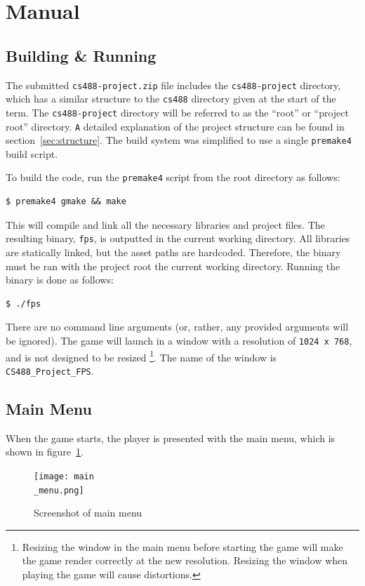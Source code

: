 \documentclass {article}
\begin{document}
\section{Manual}\label{sec:manual}
\subsection{Building \& Running}
The submitted \texttt{cs488-project.zip} file includes the \texttt{cs488-project} directory, which has a similar structure to the \texttt{cs488} directory given at the start of the term. The \texttt{cs488-project} directory will be referred to as the ``root'' or ``project root'' directory. \texttt A detailed explanation of the project structure can be found in section~\ref{sec:structure}. The build system was simplified to use a single \texttt{premake4} build script.

To build the code, run the \texttt{premake4} script from the root directory as follows:
\begin{verbatim}
$ premake4 gmake && make
\end{verbatim}

This will compile and link all the necessary libraries and project files. The resulting binary, \texttt{fps}, is outputted in the current working directory. All libraries are statically linked, but the asset paths are hardcoded. Therefore, the binary must be ran with the project root the current working directory. Running the binary is done as follows:
\begin{verbatim}
$ ./fps
\end{verbatim}

There are no command line arguments (or, rather, any provided arguments will be ignored). The game will launch in a window with a resolution of \texttt{1024 x 768}, and is not designed to be resized \footnote{Resizing the window in the main menu before starting the game will make the game render correctly at the new resolution. Resizing the window when playing the game will cause distortions.}. The name of the window is \texttt{CS488\_Project\_FPS}.

\subsection{Main Menu}
When the game starts, the player is presented with the main menu, which is shown in figure~\ref{fig:mainmenu}.

\begin{figure}[H]
  \begin{center}
  \texttt{[image: main\\\_menu.png]}
  \end{center}
  \caption{Screenshot of main menu}\label{fig:mainmenu}
\end{figure}
\end{document}
